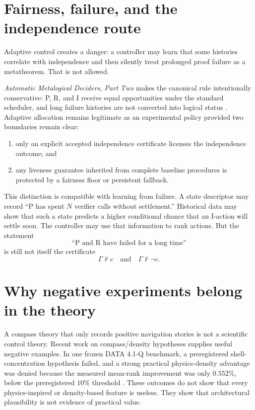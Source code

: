 \documentclass[11pt]{article}
\theoremstyle{definition}
\theoremstyle{remark}
\begin{document}
\section{Fairness, failure, and the independence route}

Adaptive control creates a danger: a controller may learn that some histories correlate with independence and then silently treat prolonged proof failure as a metatheorem. That is not allowed.

\emph{Automatic Metalogical Deciders, Part Two} makes the canonical rule intentionally conservative: P, R, and I receive equal opportunities under the standard scheduler, and long failure histories are not converted into logical status \cite{AMLD2}. Adaptive allocation remains legitimate as an experimental policy provided two boundaries remain clear:
\begin{enumerate}
\item only an explicit accepted independence certificate licenses the independence outcome; and
\item any liveness guarantee inherited from complete baseline procedures is protected by a fairness floor or persistent fallback.
\end{enumerate}

This distinction is compatible with learning from failure. A state descriptor may record ``P has spent $N$ verifier calls without settlement.'' Historical data may show that such a state predicts a higher conditional chance that an I-action will settle soon. The controller may use that information to rank actions. But the statement
\[
\text{``P and R have failed for a long time''}
\]
is still not itself the certificate
\[
\Gamma\nvdash c\quad\text{and}\quad\Gamma\nvdash\neg c.
\]

\section{Why negative experiments belong in the theory}

A compass theory that only records positive navigation stories is not a scientific control theory. Recent work on compass/density hypotheses supplies useful negative examples. In one frozen DATA 4.1-Q benchmark, a preregistered shell-concentration hypothesis failed, and a strong practical physics-density advantage was denied because the measured mean-rank improvement was only $0.552\%$, below the preregistered $10\%$ threshold \cite{CompassLimits}. These outcomes do not show that every physics-inspired or density-based feature is useless. They show that architectural plausibility is not evidence of practical value.
\end{document}
